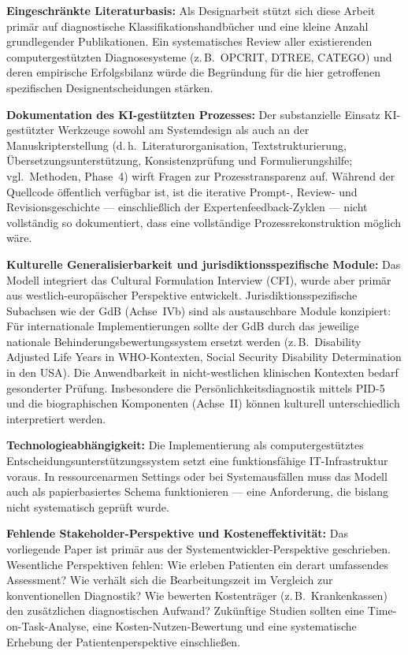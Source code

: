\documentclass[11pt,a4paper]{article}
\begin{document}
\textbf{Eingeschr\"ankte Literaturbasis:} Als Designarbeit st\"utzt sich diese Arbeit prim\"ar auf diagnostische Klassifikationshandb\"ucher und eine kleine Anzahl grundlegender Publikationen. Ein systematisches Review aller existierenden computergest\"utzten Diagnosesysteme (z.\,B.\ OPCRIT, DTREE, CATEGO) und deren empirische Erfolgsbilanz w\"urde die Begr\"undung f\"ur die hier getroffenen spezifischen Designentscheidungen st\"arken.

\textbf{Dokumentation des KI-gest\"utzten Prozesses:} Der substanzielle Einsatz KI-gest\"utzter Werkzeuge sowohl am Systemdesign als auch an der Manuskripterstellung (d.\,h.\ Literaturorganisation, Textstrukturierung, \"Ubersetzungsunterst\"utzung, Konsistenzpr\"ufung und Formulierungshilfe; vgl.\ Methoden, Phase~4) wirft Fragen zur Prozesstransparenz auf. W\"ahrend der Quellcode \"offentlich verf\"ugbar ist, ist die iterative Prompt-, Review- und Revisionsgeschichte --- einschlie\ss{}lich der Expertenfeedback-Zyklen --- nicht vollst\"andig so dokumentiert, dass eine vollst\"andige Prozessrekonstruktion m\"oglich w\"are.

\textbf{Kulturelle Generalisierbarkeit und jurisdiktionsspezifische Module:} Das Modell integriert das Cultural Formulation Interview (CFI), wurde aber prim\"ar aus westlich-europ\"aischer Perspektive entwickelt. Jurisdiktionsspezifische Subachsen wie der GdB (Achse~IVb) sind als austauschbare Module konzipiert: F\"ur internationale Implementierungen sollte der GdB durch das jeweilige nationale Behinderungsbewertungssystem ersetzt werden (z.\,B.\ Disability Adjusted Life Years in WHO-Kontexten, Social Security Disability Determination in den USA). Die Anwendbarkeit in nicht-westlichen klinischen Kontexten bedarf gesonderter Pr\"ufung. Insbesondere die Pers\"onlichkeitsdiagnostik mittels PID-5 und die biographischen Komponenten (Achse~II) k\"onnen kulturell unterschiedlich interpretiert werden.

\textbf{Technologieabh\"angigkeit:} Die Implementierung als computergest\"utztes Entscheidungsunterst\"utzungssystem setzt eine funktionsf\"ahige IT-Infrastruktur voraus. In ressourcenarmen Settings oder bei Systemausf\"allen muss das Modell auch als papierbasiertes Schema funktionieren --- eine Anforderung, die bislang nicht systematisch gepr\"uft wurde.

\textbf{Fehlende Stakeholder-Perspektive und Kosteneffektivit\"at:} Das vorliegende Paper ist prim\"ar aus der Systementwickler-Perspektive geschrieben. Wesentliche Perspektiven fehlen: Wie erleben Patienten ein derart umfassendes Assessment? Wie verh\"alt sich die Bearbeitungszeit im Vergleich zur konventionellen Diagnostik? Wie bewerten Kostentr\"ager (z.\,B.\ Krankenkassen) den zus\"atzlichen diagnostischen Aufwand? Zuk\"unftige Studien sollten eine Time-on-Task-Analyse, eine Kosten-Nutzen-Bewertung und eine systematische Erhebung der Patientenperspektive einschlie\ss{}en.
\end{document}
